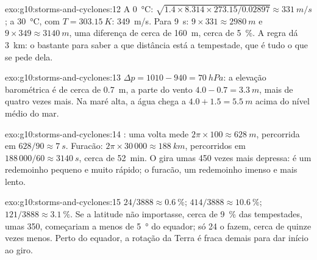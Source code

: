 \begin{solution}{exo:g10:storms-and-cyclones:12}
A \qty{0}{\degreeCelsius}: $\sqrt{1.4 \times 8.314 \times 273.15/0.02897}
\approx \qty{331}{m/s}$; a \qty{30}{\degreeCelsius}, com $T =
\qty{303.15}{K}$: \qty{349}{m/s}. Para \qty{9}{s}: $9 \times 331 \approx
\qty{2980}{m}$ e $9 \times 349 \approx \qty{3140}{m}$, uma diferença de
cerca de \qty{160}{m}, cerca de \qty{5}{\percent}. A regra dá \qty{3}{km}:
o bastante para saber a que distância está a tempestade, que é tudo o que se
pede dela.
\end{solution}

\begin{solution}{exo:g10:storms-and-cyclones:13}
$\Delta p = 1010 - 940 = \qty{70}{hPa}$: a elevação barométrica é de cerca
de \qty{0.7}{m}, a parte do vento $4.0 - 0.7 = \qty{3.3}{m}$, mais de quatro
vezes mais. Na maré alta, a água chega a $4.0 + 1.5 = \qty{5.5}{m}$ acima do
nível médio do mar.
\end{solution}

\begin{solution}{exo:g10:storms-and-cyclones:14}
: uma volta mede $2\pi \times 100 \approx \qty{628}{m}$, percorrida
em $628/90 \approx \qty{7}{s}$. Furacão: $2\pi \times 30\,000 \approx
\qty{188}{km}$, percorridos em $188\,000/60 \approx \qty{3140}{s}$, cerca de
\qty{52}{min}. O  gira umas 450 vezes mais depressa: é um redemoinho
pequeno e muito rápido; o furacão, um redemoinho imenso e mais lento.
\end{solution}

\begin{solution}{exo:g10:storms-and-cyclones:15}
$24/3888 \approx \qty{0.6}{\percent}$; $414/3888 \approx
\qty{10.6}{\percent}$; $121/3888 \approx \qty{3.1}{\percent}$. Se a latitude
não importasse, cerca de \qty{9}{\percent} das tempestades, umas 350,
começariam a menos de \qty{5}{\degree} do equador; só 24 o fazem, cerca de
quinze vezes menos. Perto do equador, a rotação da Terra é fraca demais para
dar início ao giro.
\end{solution}

